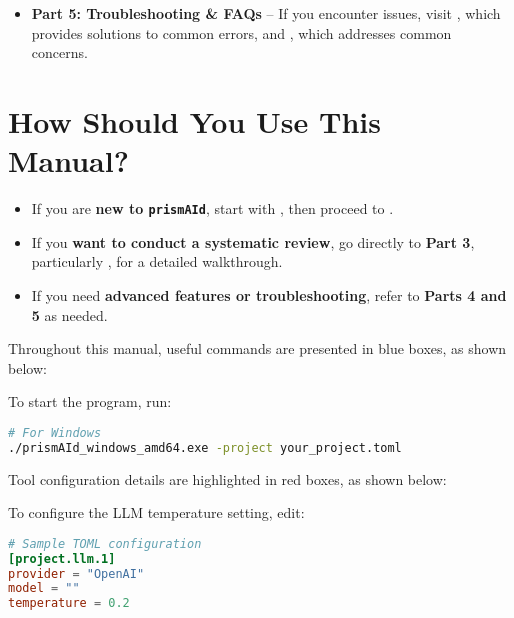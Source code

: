 \begin{itemize}
    \item \textbf{Part 5: Troubleshooting \& FAQs} – If you encounter issues, visit , which provides solutions to common errors, and , which addresses common concerns.
\end{itemize}

\section*{How Should You Use This Manual?}

\begin{itemize}
    \item If you are \textbf{new to \texttt{prismAId}}, start with , then proceed to .
    \item If you \textbf{want to conduct a systematic review}, go directly to \textbf{Part 3}, particularly , for a detailed walkthrough.
    \item If you need \textbf{advanced features or troubleshooting}, refer to \textbf{Parts 4 and 5} as needed.
\end{itemize}

Throughout this manual, useful commands are presented in blue boxes, as shown below:

\begin{commandbox}
To start the program, run:
\begin{lstlisting}[language=Bash]
# For Windows
./prismAId_windows_amd64.exe -project your_project.toml
\end{lstlisting}
\end{commandbox}

Tool configuration details are highlighted in red boxes, as shown below:

\begin{configbox}
To configure the LLM temperature setting, edit:
\begin{lstlisting}[language=TOML]
# Sample TOML configuration
[project.llm.1]
provider = "OpenAI"
model = ""
temperature = 0.2
\end{lstlisting}
\end{configbox}


